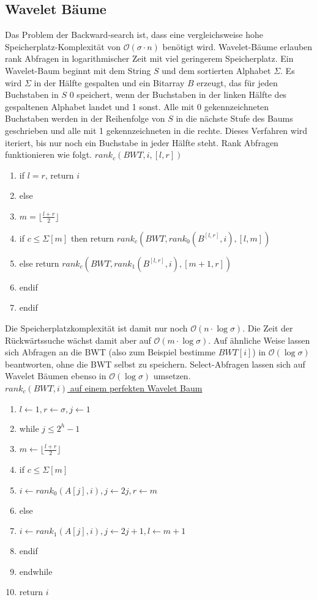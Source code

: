 \documentclass[a4paper, 12pt]{article}
\theoremstyle{plain}
\theoremstyle{definition}
\theoremstyle{lemma}
\theoremstyle{remark}
\theoremstyle{corollary}
\theoremstyle{example}
\begin{document}
	\subsection{Wavelet Bäume}
	Das Problem der Backward-search ist, dass eine vergleichsweise hohe Speicherplatz-Komplexität von $\mathcal{O}(\sigma\cdot n)$ benötigt wird. Wavelet-Bäume erlauben rank Abfragen in logarithmischer Zeit mit viel geringerem Speicherplatz. Ein Wavelet-Baum beginnt mit dem String $S$ und dem sortierten Alphabet $\Sigma$. Es wird $\Sigma$ in der Hälfte gespalten und ein Bitarray $B$ erzeugt, das für jeden Buchstaben in $S$ 0 speichert, wenn der Buchstaben in der linken Hälfte des gespaltenen Alphabet landet und 1 sonst. Alle mit 0 gekennzeichneten Buchstaben werden in der Reihenfolge von $S$ in die nächste Stufe des Baums geschrieben und alle mit 1 gekennzeichneten in die rechte. Dieses Verfahren wird iteriert, bis nur noch ein Buchstabe in jeder Hälfte steht. Rank Abfragen funktionieren wie folgt.\newpage
	\underline{$rank_c(BWT,i,[l,r])$}
	\begin{enumerate}
		\item if $l=r$, return $i$
		\item else
		\item $m = \lfloor\frac{l+r}{2}\rfloor$
		\item if $c\leq \Sigma[m]$ then return $rank_c(BWT,rank_0(B^{[l,r]},i),[l,m])$
		\item else return $rank_c(BWT,rank_1(B^{[l,r]},i),[m+1,r])$
		\item endif
		\item endif
	\end{enumerate}
	Die Speicherplatzkomplexität ist damit nur noch $\mathcal{O}(n\cdot \log \sigma)$. Die Zeit der Rückwärtssuche wächst damit aber auf $\mathcal{O}(m\cdot \log \sigma)$. Auf ähnliche Weise lassen sich Abfragen an die BWT (also zum Beispiel bestimme $BWT[i]$) in $\mathcal{O}(\log \sigma)$ beantworten, ohne die BWT selbst zu speichern. Select-Abfragen lassen sich auf Wavelet Bäumen ebenso in $\mathcal{O}(\log \sigma)$ umsetzen.\\
	\underline{$rank_c(BWT,i)$ auf einem perfekten Wavelet Baum}
	\begin{enumerate}
		\item $l\gets 1, r\gets \sigma, j \gets 1$
		\item while $j \leq 2^h-1$
		\item $m \gets \lfloor\frac{l+r}{2}\rfloor$
		\item if $c \leq \Sigma[m]$
		\item $i \gets rank_0(A[j],i), j \gets 2j, r \gets m$
		\item else 
		\item $i \gets rank_1(A[j],i), j \gets 2j+1, l \gets m+1$
		\item endif
		\item endwhile
		\item return $i$
	\end{enumerate}
\end{document}
